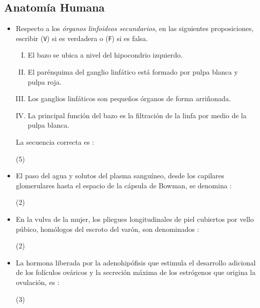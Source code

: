 \documentclass[12pt, twocolumn, landscape, a4paper]{article}
\begin{document}
\subsection*{Anatomía Humana}
\begin{itemize}
\item{Respecto a los \emph{órganos linfoideos secundarios}, en las siguientes proposiciones, escribir (\texttt{V}) si es verdadera o (\texttt{F}) si es falsa.
\begin{enumerate}[I.]
\item{El bazo se ubica a nivel del hipocondrio izquierdo.}
\item{El parénquima del ganglio linfático está formado por pulpa blanca y pulpa roja.}
\item{Los ganglios linfáticos son pequeños órganos de forma arriñonada.}
\item{La principal función del bazo es la filtración de la linfa por medio de la pulpa blanca.}
\end{enumerate}
La secuencia correcta es :
\begin{tasks}(5)
\end{tasks}
}
\item{El paso del agua y solutos del plasma sanguíneo, desde los capilares glomerulares hasta el espacio de la cápsula de Bowman, se denomina :
\begin{tasks}(2)
\end{tasks}
}
\item{En la vulva de la mujer, los pliegues longitudinales de piel cubiertos por vello púbico, homólogos del escroto del varón, son denominados :
\begin{tasks}(2)
\end{tasks}
}
\item{La hormona liberada por la adenohipófisis que estimula el desarrollo adicional de los folículos ováricos y la secreción máxima de los estrógenos que origina la ovulación, es :
\begin{tasks}(3)
\end{tasks}
}
\end{itemize}
\end{document}
